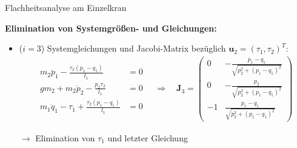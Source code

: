 \documentclass[
	ngerman,
	10pt,				%
	aspectratio=169 	%
]{beamer}
\begin{document}
\begin{frame}[t,fragile,label=Flachheit_Einzelkran_1]{\large Flachheitsanalyse am Einzelkran}
	
	\textbf{Elimination von Systemgrößen- und Gleichungen:}
	
	\begin{itemize}
		\item {($i = 3$) Systemgleichungen und Jacobi-Matrix bezüglich $\mathbf{u}_2 = (\tau_1, \tau_2)^T$:}
		\begin{align*}
		\begin{split}
		m_{2} \ddot{p}_{1} - \frac{\tau_{2} \left(p_{1} - q_{1}\right)}{l_{1}} &= 0\\
		g m_{2} + m_{2} \ddot{p}_{2} - \frac{p_{2} \tau_{2}}{l_{1}} &= 0\\
		m_{1} \ddot{q}_{1} - \tau_{1} + \frac{\tau_{2} \left(p_{1} - q_{1}\right)}{l_{1}} &= 0
		\end{split}
		\quad \Rightarrow \quad 
		\mathbf{J}_3 = 
		\left(\begin{matrix}
		0 & - \frac{p_{1} - q_{1}}{\sqrt{p_{2}^{2} + \left(p_{1} - q_{1}\right)^{2}}}\\
		0 & - \frac{p_{2}}{\sqrt{p_{2}^{2} + \left(p_{1} - q_{1}\right)^{2}}}\\
		-1 & \frac{p_{1} - q_{1}}{\sqrt{p_{2}^{2} + \left(p_{1} - q_{1}\right)^{2}}}
		\end{matrix}\right)
		\end{align*}
		\pause
		\item[$\rightarrow$] Elimination von $\tau_1$ und letzter Gleichung	
	\end{itemize}
	
\end{frame}

\end{document}
